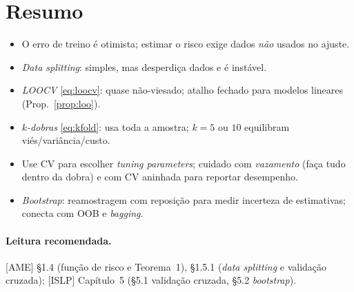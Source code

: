\documentclass[11pt,a4paper]{article}
\begin{document}
\section*{Resumo}
\begin{itemize}[leftmargin=1.4cm]
  \item O erro de treino é otimista; estimar o risco exige dados \emph{não}
        usados no ajuste.
  \item \emph{Data splitting}: simples, mas desperdiça dados e é instável.
  \item \emph{LOOCV} \eqref{eq:loocv}: quase não-viesado; atalho fechado para
        modelos lineares (Prop.~\ref{prop:loo}).
  \item \emph{$k$-dobras} \eqref{eq:kfold}: usa toda a amostra; $k=5$ ou $10$
        equilibram viés/variância/custo.
  \item Use CV para escolher \emph{tuning parameters}; cuidado com \emph{vazamento}
        (faça tudo dentro da dobra) e com CV aninhada para reportar desempenho.
  \item \emph{Bootstrap}: reamostragem com reposição para medir incerteza de
        estimativas; conecta com OOB e \emph{bagging}.
\end{itemize}

\paragraph{Leitura recomendada.} [AME] §1.4 (função de risco e Teorema~1), §1.5.1
(\emph{data splitting} e validação cruzada); [ISLP] Capítulo~5 (§5.1 validação
cruzada, §5.2 \emph{bootstrap}).
\end{document}
